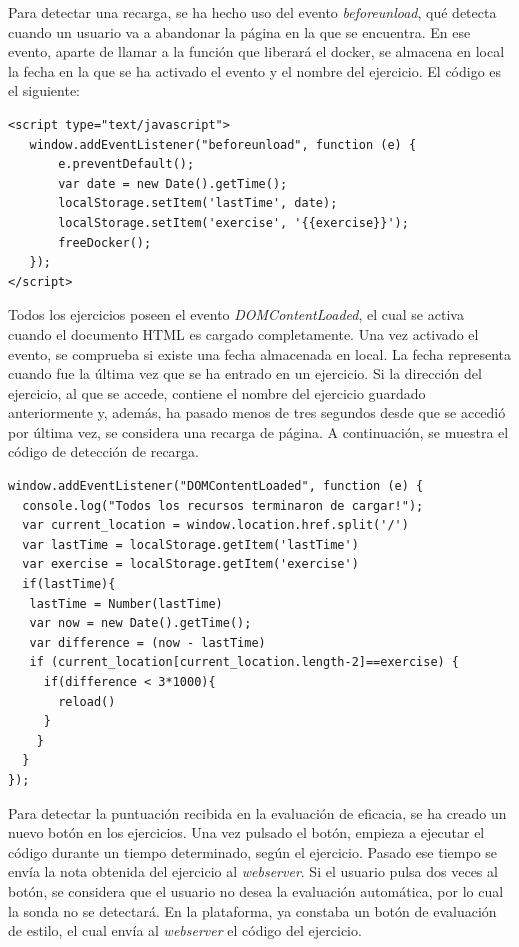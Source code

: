 Para detectar una recarga, se ha hecho uso del evento \textit{beforeunload}, qué detecta cuando un usuario va a abandonar la página en la que se encuentra. En ese evento, aparte de llamar a la función que liberará el docker, se almacena en local la fecha en la que se ha activado el evento y el nombre del ejercicio. El código es el siguiente: \\
\newpage
\begin{lstlisting}
<script type="text/javascript">
   window.addEventListener("beforeunload", function (e) {
       e.preventDefault();
       var date = new Date().getTime();
       localStorage.setItem('lastTime', date);
       localStorage.setItem('exercise', '{{exercise}}');
       freeDocker();
   });
</script>
\end{lstlisting} 
Todos los ejercicios poseen el evento \textit{DOMContentLoaded}, el cual se activa cuando el documento HTML es cargado completamente. Una vez activado el evento, se comprueba si existe una fecha almacenada en local. La fecha representa cuando fue la última vez que se ha entrado en un ejercicio. Si la dirección del ejercicio, al que se accede, contiene el nombre del ejercicio guardado anteriormente y, además, ha pasado menos de tres segundos desde que se accedió por última vez, se considera una recarga de página. A continuación, se muestra el código de detección de recarga.\\
\begin{lstlisting}
window.addEventListener("DOMContentLoaded", function (e) {
  console.log("Todos los recursos terminaron de cargar!");
  var current_location = window.location.href.split('/')
  var lastTime = localStorage.getItem('lastTime')
  var exercise = localStorage.getItem('exercise')
  if(lastTime){
   lastTime = Number(lastTime)
   var now = new Date().getTime();
   var difference = (now - lastTime)
   if (current_location[current_location.length-2]==exercise) {
     if(difference < 3*1000){
       reload()
     }
    }
  }
});
\end{lstlisting} 

Para detectar la puntuación recibida en la evaluación de eficacia, se ha creado un nuevo botón en los ejercicios. Una vez pulsado el botón, empieza a ejecutar el código durante un tiempo determinado, según el ejercicio. Pasado ese tiempo se envía la nota obtenida del ejercicio al \textit{webserver}. Si el usuario pulsa dos veces al botón, se considera que el usuario no desea la evaluación automática, por lo cual la sonda no se detectará. En la plataforma, ya constaba un botón de evaluación de estilo, el cual envía al \textit{webserver} el código del ejercicio.\\

